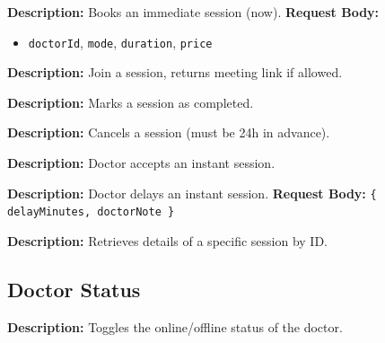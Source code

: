 \documentclass{article}
\begin{document}
\begin{tcolorbox}[title=\textcolor{accent}{POST} /api/sessions/book-immediate]
\textbf{Description:} Books an immediate session (now).
\vspace{0.5em}
\textbf{Request Body:}
\begin{itemize}
    \item \texttt{doctorId}, \texttt{mode}, \texttt{duration}, \texttt{price}
\end{itemize}
\end{tcolorbox}

\begin{tcolorbox}[title=\textcolor{accent}{GET} /api/sessions/join/:sessionId]
\textbf{Description:} Join a session, returns meeting link if allowed.
\end{tcolorbox}

\begin{tcolorbox}[title=\textcolor{accent}{POST} /api/sessions/:sessionId/complete]
\textbf{Description:} Marks a session as completed.
\end{tcolorbox}

\begin{tcolorbox}[title=\textcolor{accent}{POST} /api/sessions/:sessionId/cancel]
\textbf{Description:} Cancels a session (must be 24h in advance).
\end{tcolorbox}

\begin{tcolorbox}[title=\textcolor{accent}{POST} /api/sessions/:sessionId/accept]
\textbf{Description:} Doctor accepts an instant session.
\end{tcolorbox}

\begin{tcolorbox}[title=\textcolor{accent}{POST} /api/sessions/:sessionId/delay]
\textbf{Description:} Doctor delays an instant session.
\vspace{0.5em}
\textbf{Request Body:} \texttt{\{ delayMinutes, doctorNote \}}
\end{tcolorbox}

\begin{tcolorbox}[title=\textcolor{accent}{GET} /api/sessions/:sessionId]
\textbf{Description:} Retrieves details of a specific session by ID.
\end{tcolorbox}

\subsection{Doctor Status}

\begin{tcolorbox}[title=\textcolor{accent}{POST} /api/doctor-status/toggle-online]
\textbf{Description:} Toggles the online/offline status of the doctor.
\end{tcolorbox}
\end{document}
